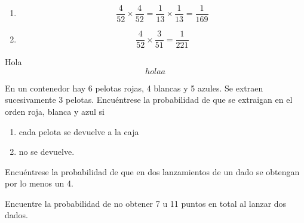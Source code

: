 \begin{solucion}
	\begin{enumerate}
		\item \[ \dfrac{4}{52}\times\dfrac{4}{52} = \dfrac{1}{13}\times \dfrac{1}{13} = \dfrac{1}{169} \]
		\item \[ \dfrac{4}{52}\times\dfrac{3}{51} = \dfrac{1}{221} \]
	\end{enumerate}
\end{solucion}

Hola
\begin{equation}\label{key}
	holaa
\end{equation}

\begin{problema}
	\label{solved:est.6.6}
	En un contenedor hay 6 pelotas rojas, 4 blancas y 5 azules. Se extraen sucesivamente 3 pelotas. Encuéntrese la probabilidad de que se extraigan en el orden roja, blanca y azul si
	\begin{enumerate}
		\item cada pelota se devuelve a la caja 
		\item no se devuelve.
	\end{enumerate}
	
\end{problema}



\begin{problema}
	\label{solved:est.6.7}
	Encuéntrese la probabilidad de que en dos lanzamientos de un dado se obtengan por lo menos un 4.
\end{problema}



\begin{problema}
	\label{solved:1.9}
	Encuentre la probabilidad de no obtener 7 u 11 puntos en total al lanzar dos dados.
\end{problema}


